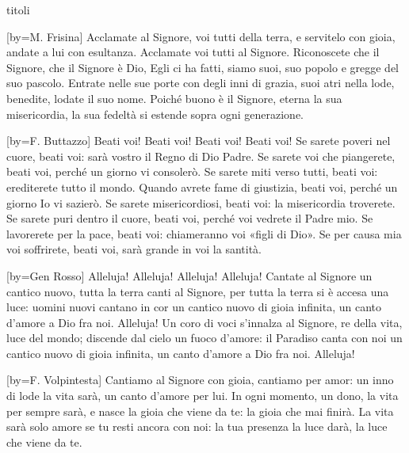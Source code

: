 \begin{songs}{titoli}

[by={M. Frisina}]
\beginchorus
Acclamate al Signore,
voi tutti della terra,
e servitelo con gioia,
andate a lui con esultanza.
Acclamate voi tutti
al Signore.
\endchorus
\beginverse
Riconoscete che il Signore, che il Signore è Dio,
Egli ci ha fatti, siamo suoi, suo popolo e gregge del suo pascolo.
\endverse
\beginverse
Entrate nelle sue porte con degli inni di grazia,
suoi atri nella lode, benedite, lodate il suo nome.
\endverse
\beginverse
Poiché buono è il Signore, eterna la sua misericordia,
la sua fedeltà si estende sopra ogni generazione.
\endverse
\endsong

[by={F. Buttazzo}]
\beginchorus
Beati voi! Beati voi! Beati voi! Beati voi!
\endchorus
\beginverse
Se sarete poveri nel cuore, beati voi:
sarà vostro il Regno di Dio Padre.
Se sarete voi che piangerete, beati voi,
perché un giorno vi consolerò.
\endverse
\beginverse
Se sarete miti verso tutti, beati voi:
erediterete tutto il mondo.
Quando avrete fame di giustizia, beati voi,
perché un giorno Io vi sazierò.
\endverse
\beginverse
Se sarete misericordiosi, beati voi:
la misericordia troverete.
Se sarete puri dentro il cuore, beati voi,
perché voi vedrete il Padre mio.
\endverse
\beginverse
Se lavorerete per la pace, beati voi:
chiameranno voi «figli di Dio».
Se per causa mia voi soffrirete, beati voi,
sarà grande in voi la santità.
\endverse
\endsong

[by={Gen Rosso}]
\beginchorus
Alleluja! Alleluja! Alleluja! Alleluja! 
\endchorus
\beginverse
Cantate al Signore un cantico nuovo, tutta la terra canti al Signore,
per tutta la terra si è accesa una luce: uomini nuovi cantano in cor
un cantico nuovo di gioia infinita, un canto d'amore a Dio fra noi.
Alleluja!
\endverse
\beginverse
Un coro di voci s'innalza al Signore, re della vita, luce del mondo;
discende dal cielo un fuoco d'amore: il Paradiso canta con noi
un cantico nuovo di gioia infinita, un canto d'amore a Dio fra noi.
Alleluja!
\endverse
\endsong

[by={F. Volpintesta}]
\beginchorus
Cantiamo al Signore con gioia,
cantiamo per amor:
un inno di lode la vita sarà,
un canto d'amore per lui. 
\endchorus
\beginverse
In ogni momento, un dono,
la vita per sempre sarà,
e nasce la gioia che viene da te:
la gioia che mai finirà.
\endverse
\beginverse
La vita sarà solo amore
se tu resti ancora con noi:
la tua presenza la luce darà,
la luce che viene da te.
\endverse
\endsong


\end{songs}
